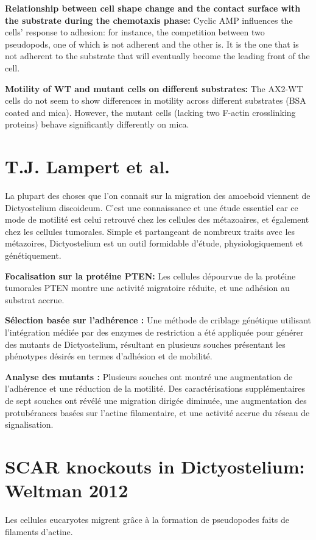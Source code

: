 \documentclass[twocolumn,10pt]{article} %
\begin{document}
\textbf{Relationship between cell shape change and the contact surface with the substrate during the chemotaxis phase:}
Cyclic AMP influences the cells' response to adhesion: for instance, the competition between two pseudopods, one of which is not adherent and the other is. It is the one that is not adherent to the substrate that will eventually become the leading front of the cell.

\textbf{Motility of WT and mutant cells on different substrates:}
The AX2-WT cells do not seem to show differences in motility across different substrates (BSA coated and mica).
However, the mutant cells (lacking two F-actin crosslinking proteins) behave significantly differently on mica.

\section{T.J. Lampert et al.}
\cite{Weber_2017}
La plupart des choses que l'on connait sur la migration des amoeboid viennent de Dictyostelium discoideum.
C'est une connaissance et une étude essentiel car ce mode de motilité est celui retrouvé chez les cellules des métazoaires,
et également chez les cellules tumorales. 
Simple et partangeant de nombreux traits avec les métazoires, Dictyostelium est un outil formidable d'étude, physiologiquement
et génétiquement. 

\textbf{Focalisation sur la protéine PTEN:}
Les cellules dépourvue de la protéine tumorales PTEN montre une activité migratoire réduite, et une adhésion au substrat accrue. 

\textbf{Sélection basée sur l'adhérence :} 
Une méthode de criblage génétique utilisant l'intégration médiée par des enzymes de 
restriction a été appliquée pour générer des mutants de Dictyostelium, résultant en plusieurs souches présentant les phénotypes 
désirés en termes d'adhésion et de mobilité.

\textbf{Analyse des mutants :} 
Plusieurs souches ont montré une augmentation de l'adhérence et une réduction de la motilité. 
Des caractérisations supplémentaires de sept souches ont révélé une migration dirigée diminuée, une augmentation des 
protubérances basées sur l'actine filamentaire, et une activité accrue du réseau de signalisation.




\section{SCAR knockouts in Dictyostelium: Weltman 2012}
Les cellules eucaryotes migrent grâce à la formation de pseudopodes faits de filaments d'actine. \cite{Veltman_2012}
\end{document}
